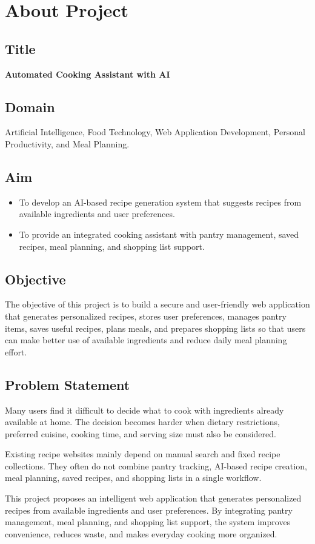 \section{About Project}

\subsection{Title}
\textbf{Automated Cooking Assistant with AI}

\subsection{Domain}
Artificial Intelligence, Food Technology, Web Application Development, Personal Productivity, and Meal Planning.

\subsection{Aim}
\begin{itemize}
\item To develop an AI-based recipe generation system that suggests recipes from available ingredients and user preferences.
\item To provide an integrated cooking assistant with pantry management, saved recipes, meal planning, and shopping list support.
\end{itemize}

\subsection{Objective}
The objective of this project is to build a secure and user-friendly web application that generates personalized recipes, stores user preferences, manages pantry items, saves useful recipes, plans meals, and prepares shopping lists so that users can make better use of available ingredients and reduce daily meal planning effort.

\subsection{Problem Statement}
Many users find it difficult to decide what to cook with ingredients already available at home. The decision becomes harder when dietary restrictions, preferred cuisine, cooking time, and serving size must also be considered.

Existing recipe websites mainly depend on manual search and fixed recipe collections. They often do not combine pantry tracking, AI-based recipe creation, meal planning, saved recipes, and shopping lists in a single workflow.

This project proposes an intelligent web application that generates personalized recipes from available ingredients and user preferences. By integrating pantry management, meal planning, and shopping list support, the system improves convenience, reduces waste, and makes everyday cooking more organized.
